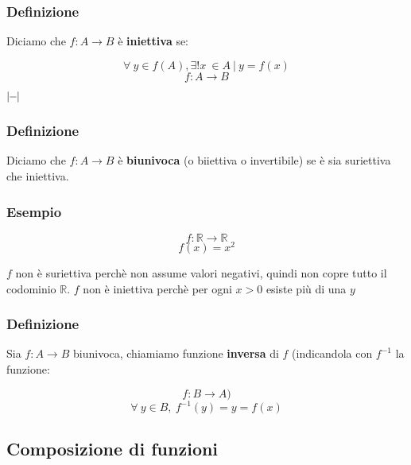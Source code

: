     \subsubsection*{Definizione}
        Diciamo che $f:A\rightarrow B$ è \textbf{iniettiva} se:
        \begin{large}
            \[
                \forall\ y \in f(A), \exists! x\ \in A\ |\ y = f(x)    
            \]
            \[
                f:A \rightarrow B    
            \]
        \end{large}
        \vspace{-7ex}
        \begin{center}
            \begin{small}
                \hspace{0.5cm}$|\text{\hspace{-0.1cm}}-\text{\hspace{-0.1cm}}|$
            \end{small}
        \end{center}
    \subsubsection*{Definizione}
        Diciamo che $f:A\rightarrow B$ è \textbf{biunivoca} (o biiettiva o invertibile) se è sia suriettiva che iniettiva.

    \subsubsection*{Esempio}
        \[f: \mathbb{R} \rightarrow \mathbb{R}\]
        \[f(x) = x^{2}\]

        $f$ non è suriettiva perchè non assume valori negativi, quindi non copre tutto il codominio $\mathbb{R}$.
        $f$ non è iniettiva perchè per ogni $x > 0$ esiste più di una $y$

    \subsubsection*{Definizione}
        Sia $f: A\rightarrow B$ biunivoca, chiamiamo funzione \textbf{inversa} di $f$ (indicandola con $f^{-1}$ la funzione:
        \begin{Large}
            \[
                f:B \rightarrow A)
            \]
            \[
                \forall\ y \in B,\ f^{-1}(y) = y = f(x)    
            \]
        \end{Large}
\subsection{Composizione di funzioni}
